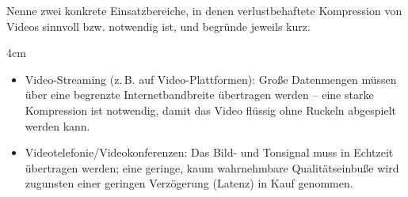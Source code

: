 
\question[3]
Nenne zwei konkrete Einsatzbereiche, in denen verlustbehaftete Kompression 
von Videos sinnvoll bzw. notwendig ist, und begründe jeweils kurz.

\begin{solutionbox}{4cm}
\begin{itemize}
\item Video-Streaming (z.\,B. auf Video-Plattformen): Große Datenmengen müssen über
 eine begrenzte Internetbandbreite übertragen werden -- eine starke Kompression 
 ist notwendig, damit das Video flüssig ohne Ruckeln abgespielt werden kann.
\item Videotelefonie/Videokonferenzen: Das Bild- und Tonsignal muss in Echtzeit
 übertragen werden; eine geringe, kaum wahrnehmbare Qualitätseinbuße wird zugunsten 
 einer geringen Verzögerung (Latenz) in Kauf genommen.
\end{itemize}
\end{solutionbox}